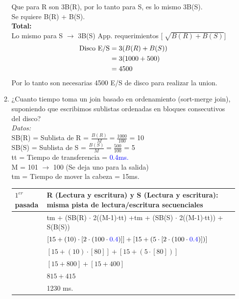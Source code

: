 \documentclass{templateNote}
\begin{document}
\begin{enumerate}
\begin{enumerate}[label=\alph*)]
        \vspace{0.5cm}
        \noindent Que para R son 3B(R), por lo tanto para S, es lo mismo 3B(S). \\Se rquiere B(R) + B(S). \\

        \textbf{Total: }\\
        Lo mismo para S $\rightarrow$ 3B(S) App. requerimientos [$\sqrt[]{{B(R)+B(S)}}$]\\
        \begin{align*}
            \textnormal{Disco E/S} &= 3(B(R)+B(S)) \\
            &= 3(1000+500) \\
            &= 4500 \\ 
        \end{align*}
        Por lo tanto son necesarias 4500 E/S de disco para realizar la union.\\

        \item ¿Cuanto tiempo toma un join basado en ordenamiento (sort-merge join), suponiendo que escribimos sublistas ordenadas en bloques consecutivos del disco? \\
        
        \textit{Datos:}\\
        SB(R) = Sublista de R = $\frac{B(R)}{M} = \frac{1000}{100}$ = 10 \\
        SB(S) = Sublista de S = $\frac{B(S)}{M} = \frac{500}{100}$ = 5 \\
        tt = Tiempo de transferencia = \textcolor{blue}{0.4ms.}\\
        M = 101 $\rightarrow$ 100 (Se deja uno para la salida)\\
        tm = Tiempo de mover la cabeza = 15ms.\\

        \begin{tabular}{|m{2cm}|m{12cm}|}
            \hline
            $1^{er}$ pasada & R (Lectura y escritura) y S (Lectura y escritura): misma pista de lectura/escritura secuenciales \\
            \hline
            & tm + (SB(R) $\cdot$ 2((M-1)$\cdot$tt) +tm + (SB(S) $\cdot$ 2((M-1)$\cdot$tt)) + S(B(S)) \\
            & $[15+(10)\cdot[2\cdot(100\cdot\textcolor{blue}{0.4})]]+[15+(5\cdot[2\cdot(100\cdot\textcolor{blue}{0.4})])]$ \\ 
            & $[15+(10)\cdot[80]]+[15+(5\cdot[80])]$ \\
            & $[15+800]+[15+400]$ \\
            & $815+415$ \\
            & 1230 ms. \\
            \hline
        \end{tabular}


\end{enumerate}
\end{enumerate}
\end{document}
